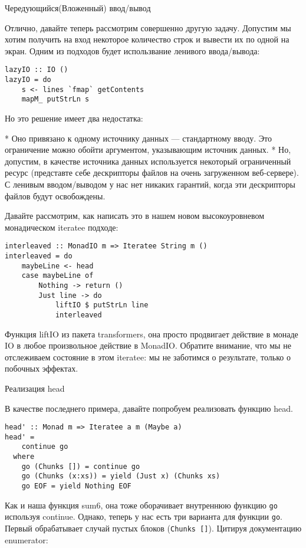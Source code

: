 Чередующийся(Вложенный) ввод/вывод

Отлично, давайте теперь рассмотрим совершенно другую задачу. Допустим мы хотим получить на вход некоторое количество строк и вывести их по одной на экран. Одним из подходов будет использвание ленивого ввода/вывода:

\begin{lstlisting}
lazyIO :: IO ()
lazyIO = do
    s <- lines `fmap` getContents
    mapM_ putStrLn s
\end{lstlisting}

Но это решение имеет два недостатка:

* Оно привязано к одному источнику данных --- стандартному вводу. Это ограничение можно обойти аргументом, указывающим источник данных.
* Но, допустим, в качестве источника данных используется некоторый ограниченный ресурс (представте себе дескрипторы файлов на очень загруженном веб-сервере). С ленивым вводом/выводом у нас нет никаких гарантий, когда эти дескрипторы файлов будут освобождены.

Давайте рассмотрим, как написать это в нашем новом высокоуровневом монадическом iteratee подходе:

\begin{lstlisting}
interleaved :: MonadIO m => Iteratee String m ()
interleaved = do
    maybeLine <- head
    case maybeLine of
        Nothing -> return ()
        Just line -> do
            liftIO $ putStrLn line
            interleaved
\end{lstlisting}

Функция liftIO из пакета transformers, она просто продвигает действие в монаде IO в любое произвольное действие в MonadIO. Обратите внимание, что мы не отслеживаем состояние в этом iteratee: мы не заботимся о результате, только о побочных эффектах.

Реализация head

В качестве последнего примера, давайте попробуем реализовать функцию head.

\begin{lstlisting}
head' :: Monad m => Iteratee a m (Maybe a)
head' =
    continue go
  where
    go (Chunks []) = continue go
    go (Chunks (x:xs)) = yield (Just x) (Chunks xs)
    go EOF = yield Nothing EOF
\end{lstlisting}

Как и наша функция sum6, она тоже оборачивает внутреннюю функцию \lstinline'go' используя continue. Однако, теперь у нас есть три варианта для функции \lstinline'go'. Первый обрабатывает случай пустых блоков (\lstinline'Chunks []'). Цитируя документацию enumerator:

